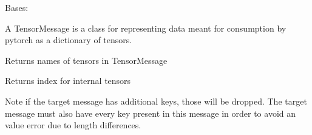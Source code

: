 \documentclass[letterpaper,10pt,english]{sphinxmanual}
\begin{document}
\begin{fulllineitems}
\label{\detokenize{Fireworks:Fireworks.core.message.TensorMessage}}
Bases: 

A TensorMessage is a class for representing data meant for consumption by pytorch as a dictionary of tensors.

\begin{fulllineitems}
\label{\detokenize{Fireworks:Fireworks.core.message.TensorMessage.keys}}
\end{fulllineitems}


\begin{fulllineitems}
\label{\detokenize{Fireworks:Fireworks.core.message.TensorMessage.columns}}
Returns names of tensors in TensorMessage

\end{fulllineitems}


\begin{fulllineitems}
\label{\detokenize{Fireworks:Fireworks.core.message.TensorMessage.index}}
Returns index for internal tensors

\end{fulllineitems}


\begin{fulllineitems}
\label{\detokenize{Fireworks:Fireworks.core.message.TensorMessage.append}}
Note if the target message has additional keys, those will be dropped.
The target message must also have every key present in this message in
order to avoid an value error due to length differences.


\end{fulllineitems}
\end{fulllineitems}
\end{document}
